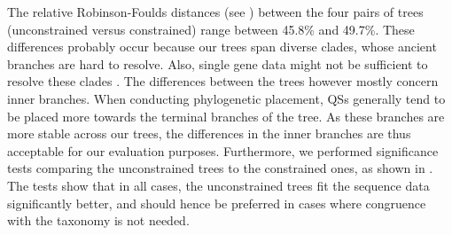The relative Robinson-Foulds distances \cite{Robinson1981}
(see )
between the four pairs of trees (unconstrained versus constrained) range between \num{45.8}\% and \num{49.7}\%.
These differences probably occur because our trees span diverse clades,
whose ancient branches are hard to resolve. %
Also, single gene data might not be sufficient to resolve these clades \cite{Kupczok2010}.
%
The differences between the trees however mostly concern inner branches.
When conducting phylogenetic placement,
\acp{QS} generally tend to be placed more towards the terminal branches of the tree.
As these branches are more stable across our trees,
the differences in the inner branches are thus acceptable for our evaluation purposes.
Furthermore, we performed significance tests comparing the unconstrained trees to the constrained ones,
as shown in .
The tests show that in all cases, the unconstrained trees fit the sequence data significantly better,
and should hence be preferred in cases where congruence with the taxonomy is not needed.

